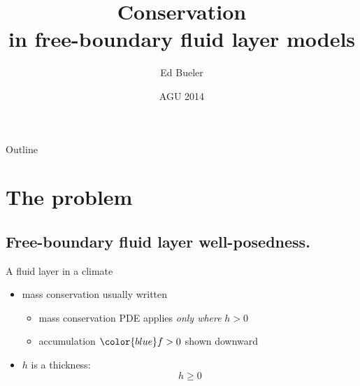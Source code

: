 \documentclass{beamer}
\title[Conservation in free-boundary layers] %
{Conservation \\ in free-boundary fluid layer models}
\author{Ed Bueler}
\institute[UAF] %
{
  Dept of Mathematics and Statistics, and Geophysical Institute\\
  University of Alaska Fairbanks%
}
\date{{\scriptsize AGU 2014}}
\newcommand\bq{\mathbf{q}}
\newcommand{\Div}{\nabla\cdot}
\begin{document}
\begin{frame}
  \titlepage
\end{frame}

\begin{frame}{Outline}
  \tableofcontents
\end{frame}





\section{The problem}

\subsection{Free-boundary fluid layer well-posedness.}

\begin{frame}{A fluid layer in a climate}

\begin{center}
\end{center}

\vspace{-9mm}
  \begin{itemize}
  \item mass conservation usually written
     \only<1>{$$h_t + \Div\bq = f$$}
     \only<2->{$$h_t + \Div\bq = {\color{blue} f}$$}
    \begin{itemize}
    \vspace{-6mm}
    \item<1->[$\circ$] mass conservation PDE applies \emph{only where} $h>0$
    \item<2->[$\circ$] accumulation ${\color{blue} f}>0$ shown downward
    \end{itemize}
  \item<3> $h$ is a thickness:
      $$h\ge 0$$
  \end{itemize}
\end{frame}
\end{document}
